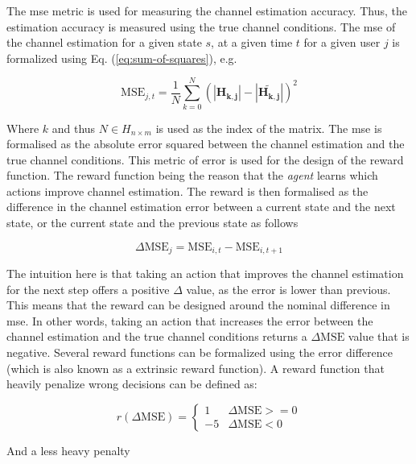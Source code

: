 The \gls{mse} metric is used for measuring the channel estimation accuracy. Thus, the estimation accuracy is measured using the true channel conditions. The \gls{mse} of the channel estimation for a given state $s$, at a given time $t$ for a given user $j$ is formalized using Eq. (\ref{eq:sum-of-squares}), e.g.

\begin{equation}\label{eq:mse_channel_estimation}
    \text{MSE}_{j,t} = \frac{1}{N} \sum_{k = 0}^{N} ( |\mathbf{H_{k,j}}| - |\mathbf{\widetilde{H_{k,j}}}| )^2
\end{equation}

Where $k$ and thus $N \in H_{n \times m}$ is used as the index of the matrix. The \gls{mse} is formalised as the absolute error squared between the channel estimation and the true channel conditions. This metric of error is used for the design of the reward function. The reward function being the reason that the \emph{agent} learns which actions improve channel estimation. The reward is then formalised as the difference in the channel estimation error between a current state and the next state, or the current state and the previous state as follows

\begin{equation}
    \Delta \text{MSE}_j = \text{MSE}_{i,t} - \text{MSE}_{i,t+1}
\end{equation}

The intuition here is that taking an action that improves the channel estimation for the next step offers a positive $\Delta$ value, as the error is lower than previous. This means that the reward can be designed around the nominal difference in \gls{mse}. In other words, taking an action that increases the error between the channel estimation and the true channel conditions returns a $\Delta \text{MSE}$ value that is negative. Several reward functions can be formalized using the error difference (which is also known as a extrinsic reward function). A reward function that heavily penalize wrong decisions can be defined as:

\begin{equation}\label{eq:reward_minus_5}
r(\Delta \text{MSE}) = \begin{cases}
1 &\Delta \text{MSE} >= 0\\
-5 &\Delta \text{MSE} < 0
\end{cases}
\end{equation}

\noindent And a less heavy penalty


